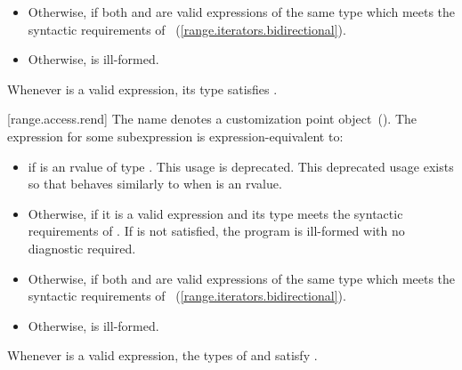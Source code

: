 {\begin{itemize}
\item
  Otherwise,  if both
   and  are valid expressions of the same
  type  which meets the syntactic requirements of
  ~(\ref{range.iterators.bidirectional}).

\item
  Otherwise,  is ill-formed.
\end{itemize}

\pnum
\enternote Whenever  is a valid expression, its
type satisfies . \exitnote

[range.access.rend]{}
\pnum
The name  denotes a customization point
object~(). The expression
 for some subexpression  is expression-equivalent to:

\begin{itemize}
\item
   if  is an rvalue of
  type . This usage is deprecated.
  \enternote This deprecated usage exists so that
   behaves similarly to 
   when  is an rvalue. \exitnote

\item
  Otherwise,  if it is a valid expression and its type  meets the
  syntactic requirements of
  . If
   is not satisfied, the program is ill-formed with
  no diagnostic required.

\item
  Otherwise,  if both
   and  are valid expressions of the same
  type  which meets the syntactic requirements of
  ~(\ref{range.iterators.bidirectional}).

\item
  Otherwise,  is ill-formed.
\end{itemize}

\pnum
\enternote Whenever  is a valid expression, the
types of  and  satisfy
. \exitnote

}
